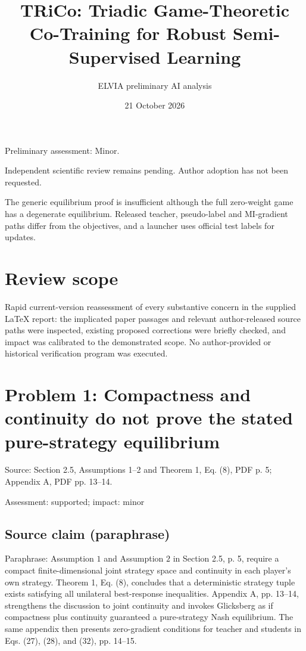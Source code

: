 \documentclass[11pt]{article}
\begin{document}
\title{TRiCo: Triadic Game-Theoretic Co-Training for Robust Semi-Supervised Learning}

\author{ELVIA preliminary AI analysis}\date{21 October 2026}\maketitle

Preliminary assessment: Minor.\par

Independent scientific review remains pending. Author adoption has not been requested.

The generic equilibrium proof is insufficient although the full zero-weight game has a degenerate equilibrium. Released teacher, pseudo-label and MI-gradient paths differ from the objectives, and a launcher uses official test labels for updates.

\section*{Review scope}

Rapid current-version reassessment of every substantive concern in the supplied LaTeX report: the implicated paper passages and relevant author-released source paths were inspected, existing proposed corrections were briefly checked, and impact was calibrated to the demonstrated scope. No author-provided or historical verification program was executed.

\section*{Problem 1: Compactness and continuity do not prove the stated pure-strategy equilibrium}

Source: Section 2.5, Assumptions 1–2 and Theorem 1, Eq. (8), PDF p. 5; Appendix A, PDF pp. 13–14.

Assessment: supported; impact: minor

\subsection*{Source claim (paraphrase)}

Paraphrase: Assumption \(1\) and Assumption \(2\) in Section 2.5, p. 5, require a compact finite-dimensional joint strategy space and continuity in each player’s own strategy. Theorem 1, Eq. (8), concludes that a deterministic strategy tuple exists satisfying all unilateral best-response inequalities. Appendix A, pp. 13–14, strengthens the discussion to joint continuity and invokes Glicksberg as if compactness plus continuity guaranteed a pure-strategy Nash equilibrium. The same appendix then presents zero-gradient conditions for teacher and students in Eqs. (27), (\(28\)), and (\(32\)), pp. 14–15.
\end{document}
